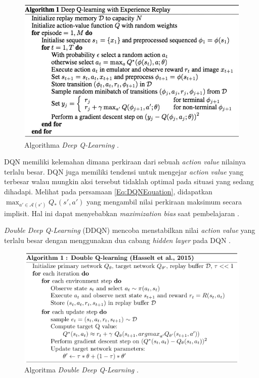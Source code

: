 \begin{figure}[H]
  \centering
    \includegraphics[scale=0.4]{gambar/dqn_algorithm.png}
    \caption{Algorithma \emph{Deep Q-Learning} \citep{deepQN}.}
    \label{fig:dqnAlgorithm}
\end{figure}

DQN memiliki kelemahan dimana perkiraan dari sebuah \emph{action value} nilainya terlalu besar.
DQN juga memiliki tendensi untuk mengejar \emph{action value} yang terbesar walau mungkin aksi tersebut tidaklah optimal pada situasi yang sedang dihadapi.
Melihat pada persamaan \ref{Eq:DQNEquation}, didapatkan $\max_{a'\in\mathcal{A}(s')}Q_*(s',a')$
yang mengambil nilai perkiraan maksimum secara implisit. Hal ini dapat menyebabkan \emph{maximization bias}
saat pembelajaran \cite{doubleQLearning}.

\emph{Double Deep Q-Learning} (DDQN) mencoba menstabilkan nilai \emph{action value} yang terlalu besar dengan menggunakan dua cabang \emph{hidden layer} pada DQN \citep{doubleDQN}.

\begin{figure}[H]
  \centering
    \includegraphics[scale=0.6]{gambar/ddqn_algorithm.png}
    \caption{Algoritma \emph{Double Deep Q-Learning} \citep{doubleDQN}.}
    \label{fig:ddqnAlgorithm}
\end{figure}

